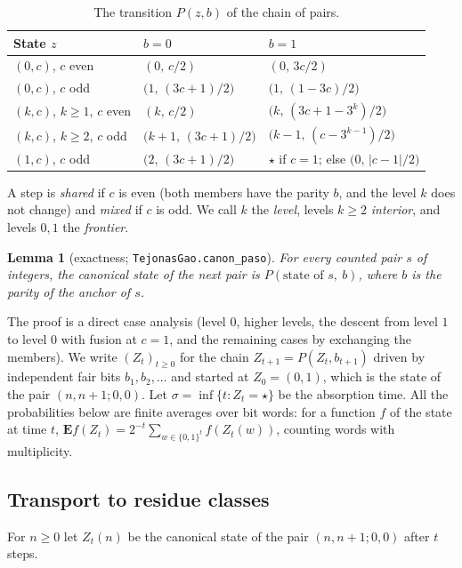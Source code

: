 \documentclass[11pt]{amsart}
\newtheorem{lemma}[theorem]{Lemma}
\theoremstyle{definition}
\theoremstyle{remark}
\newcommand{\E}{\mathbf{E}}
\newcommand{\fus}{\star}
\newcommand{\lean}[1]{\nolinkurl{#1}}
\begin{document}
\begin{table}[ht]
\caption{The transition $P(z,b)$ of the chain of pairs.}\label{tab:P}
\small
\begin{tabular}{@{}lll@{}}
\toprule
State $z$ & $b=0$ & $b=1$ \\
\midrule
$(0,c)$, $c$ even & $(0,\,c/2)$ & $(0,\,3c/2)$ \\
$(0,c)$, $c$ odd & $\bigl(1,\,(3c+1)/2\bigr)$ & $\bigl(1,\,(1-3c)/2\bigr)$ \\
$(k,c)$, $k\ge1$, $c$ even & $(k,\,c/2)$ & $\bigl(k,\,(3c+1-3^k)/2\bigr)$ \\
$(k,c)$, $k\ge2$, $c$ odd & $\bigl(k+1,\,(3c+1)/2\bigr)$ & $\bigl(k-1,\,(c-3^{k-1})/2\bigr)$ \\
$(1,c)$, $c$ odd & $\bigl(2,\,(3c+1)/2\bigr)$ & $\fus$ if $c=1$; else $\bigl(0,\,|c-1|/2\bigr)$ \\
\bottomrule
\end{tabular}
\end{table}
A step is \emph{shared} if $c$ is even (both members have the parity $b$, and the level $k$ does not change) and \emph{mixed} if $c$ is odd. We call $k$ the \emph{level}, levels $k\ge2$ \emph{interior}, and levels $0,1$ the \emph{frontier}.

\begin{lemma}[exactness; \lean{TejonasGao.canon_paso}]\label{lem:exact}
For every counted pair $s$ of integers, the canonical state of the next pair is $P(\text{state of } s,\ b)$, where $b$ is the parity of the anchor of $s$.
\end{lemma}

The proof is a direct case analysis (level $0$, higher levels, the descent from level $1$ to level $0$ with fusion at $c=1$, and the remaining cases by exchanging the members). We write $(Z_t)_{t\ge0}$ for the chain $Z_{t+1}=P(Z_t,b_{t+1})$ driven by independent fair bits $b_1,b_2,\dots$ and started at $Z_0=(0,1)$, which is the state of the pair $(n,n+1;0,0)$. Let $\sigma=\inf\{t: Z_t=\fus\}$ be the absorption time. All the probabilities below are finite averages over bit words: for a function $f$ of the state at time $t$, $\E f(Z_t)=2^{-t}\sum_{w\in\{0,1\}^t} f(Z_t(w))$, counting words with multiplicity.

\subsection{Transport to residue classes}
For $n\ge0$ let $Z_t(n)$ be the canonical state of the pair $(n,n+1;0,0)$ after $t$ steps.
\end{document}
